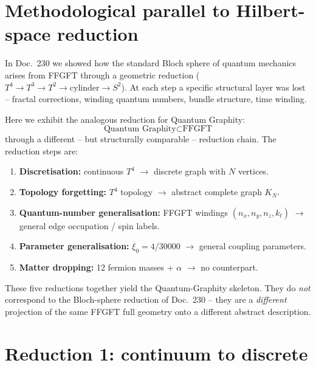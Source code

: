 \section{Methodological parallel to Hilbert-space reduction}

In Doc.~230 we showed how the standard Bloch sphere of quantum
mechanics arises from FFGFT through a geometric reduction
($T^4 \to T^3 \to T^2 \to \text{cylinder} \to S^2$). At each step a
specific structural layer was lost -- fractal corrections, winding
quantum numbers, bundle structure, time winding.

Here we exhibit the analogous reduction for Quantum Graphity:
\begin{equation}
  \boxed{\text{Quantum Graphity} \subset \text{FFGFT}}
\end{equation}
through a different -- but structurally comparable -- reduction
chain. The reduction steps are:
\begin{enumerate}[leftmargin=2em,itemsep=2pt,topsep=2pt]
  \item \textbf{Discretisation:} continuous $T^4$ $\to$ discrete
        graph with $N$ vertices.
  \item \textbf{Topology forgetting:} $T^4$ topology $\to$ abstract
        complete graph $K_N$.
  \item \textbf{Quantum-number generalisation:} FFGFT windings
        $(n_x, n_y, n_z, k_t)$ $\to$ general edge occupation /
        spin labels.
  \item \textbf{Parameter generalisation:} $\xi_0 = 4/30000$ $\to$
        general coupling parameters.
  \item \textbf{Matter dropping:} 12 fermion masses + $\alpha$
        $\to$ no counterpart.
\end{enumerate}

These five reductions together yield the Quantum-Graphity skeleton.
They do \emph{not} correspond to the Bloch-sphere reduction of
Doc.~230 -- they are a \emph{different} projection of the same
FFGFT full geometry onto a different abstract description.

\section{Reduction 1: continuum to discrete}

